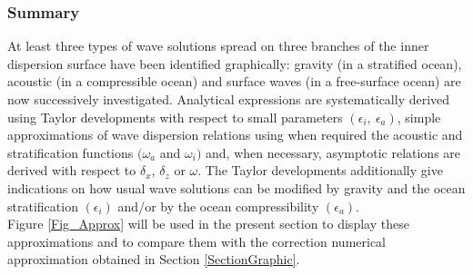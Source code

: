 \documentclass[a4paper,11pt]{article}
\begin{document}

\subsubsection{Summary}
At least three types of wave solutions spread on three branches of the inner dispersion surface have been identified graphically: gravity (in a stratified ocean), acoustic (in a compressible ocean) and surface waves (in a free-surface ocean) are now successively investigated. Analytical expressions are systematically derived using Taylor developments with respect to small parameters $(\epsilon_i,\ \epsilon_a)$, simple approximations of wave dispersion relations using when required the acoustic and stratification functions $(\omega_a$ and $\omega_i)$ and, when necessary, asymptotic relations are derived with respect to $\delta_x$, $\delta_z$ or $\omega$. The Taylor developments additionally give indications on how usual wave solutions can be modified by gravity and the ocean stratification $(\epsilon_i)$ and/or by the ocean compressibility $(\epsilon_a)$.\\
Figure \ref{Fig_Approx} will be used in the present section to display these approximations and to compare them with the correction numerical approximation obtained in Section \ref{SectionGraphic}.
\end{document}
